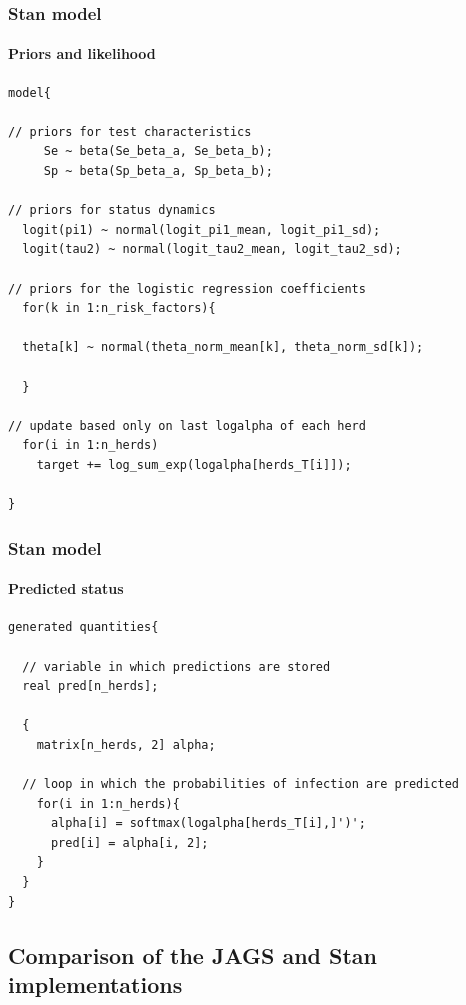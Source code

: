 \documentclass{beamer}
\begin{document}
\begin{frame}[fragile]
\frametitle{Stan model}
\framesubtitle{Priors and likelihood}
\scriptsize
\begin{verbatim}
model{

// priors for test characteristics
     Se ~ beta(Se_beta_a, Se_beta_b);
     Sp ~ beta(Sp_beta_a, Sp_beta_b);

// priors for status dynamics
  logit(pi1) ~ normal(logit_pi1_mean, logit_pi1_sd);
  logit(tau2) ~ normal(logit_tau2_mean, logit_tau2_sd);

// priors for the logistic regression coefficients
  for(k in 1:n_risk_factors){

  theta[k] ~ normal(theta_norm_mean[k], theta_norm_sd[k]);

  }

// update based only on last logalpha of each herd
  for(i in 1:n_herds)
    target += log_sum_exp(logalpha[herds_T[i]]);

}
\end{verbatim}
\end{frame}


\begin{frame}[fragile]
\frametitle{Stan model}
\framesubtitle{Predicted status}
\scriptsize
\begin{verbatim}
generated quantities{

  // variable in which predictions are stored
  real pred[n_herds];

  {
    matrix[n_herds, 2] alpha;

  // loop in which the probabilities of infection are predicted
    for(i in 1:n_herds){
      alpha[i] = softmax(logalpha[herds_T[i],]')';
      pred[i] = alpha[i, 2];
    }
  }
}
\end{verbatim}
\end{frame}


\subsection[JAGS vs. Stan]{Comparison of the JAGS and Stan implementations}
\end{document}

